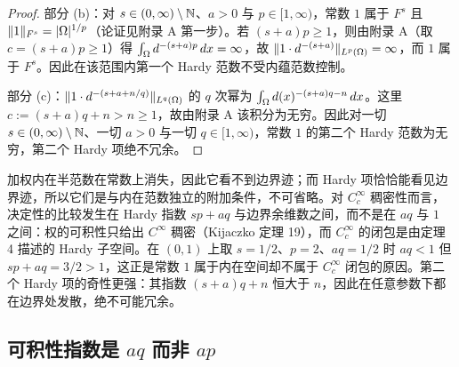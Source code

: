 \begin{proof}
部分 (b)：对 $s\in(0,\infty)\setminus\mathbb{N}$、$a>0$ 与 $p\in[1,\infty)$，常数 $1$ 属于 $F^s$ 且 $\|1\|_{F^s}=|\Omega|^{1/p}$（论证见附录 A 第一步）。若 $(s+a)p\ge1$，则由附录 A（取 $c=(s+a)p\ge1$）得 $\int_\Omega d^{-(s+a)p}\,dx=\infty$，故 $\|1\cdot d^{-(s+a)}\|_{L^p(\Omega)}=\infty$，而 $1$ 属于 $F^s$。因此在该范围内第一个 Hardy 范数不受内蕴范数控制。

部分 (c)：$\|1\cdot d^{-(s+a+n/q)}\|_{L^q(\Omega)}$ 的 $q$ 次幂为 $\int_\Omega d(x)^{-(s+a)q-n}\,dx$。这里 $c:=(s+a)q+n>n\ge1$，故由附录 A 该积分为无穷。因此对一切 $s\in(0,\infty)\setminus\mathbb{N}$、一切 $a>0$ 与一切 $q\in[1,\infty)$，常数 $1$ 的第二个 Hardy 范数为无穷，第二个 Hardy 项绝不冗余。
\end{proof}

\begin{remark}[直觉]
加权内在半范数在常数上消失，因此它看不到边界迹；而 Hardy 项恰恰能看见边界迹，所以它们是与内在范数独立的附加条件，不可省略。对 $C_c^\infty$ 稠密性而言，决定性的比较发生在 Hardy 指数 $sp+aq$ 与边界余维数之间，而不是在 $aq$ 与 $1$ 之间：权的可积性只给出 $C^\infty$ 稠密（Kijaczko 定理 19），而 $C_c^\infty$ 的闭包是由定理 4 描述的 Hardy 子空间。在 $(0,1)$ 上取 $s=1/2$、$p=2$、$aq=1/2$ 时 $aq<1$ 但 $sp+aq=3/2>1$，这正是常数 $1$ 属于内在空间却不属于 $C_c^\infty$ 闭包的原因。第二个 Hardy 项的奇性更强：其指数 $(s+a)q+n$ 恒大于 $n$，因此在任意参数下都在边界处发散，绝不可能冗余。
\end{remark}

\subsection{可积性指数是 \texorpdfstring{$aq$}{aq} 而非 \texorpdfstring{$ap$}{ap}}

